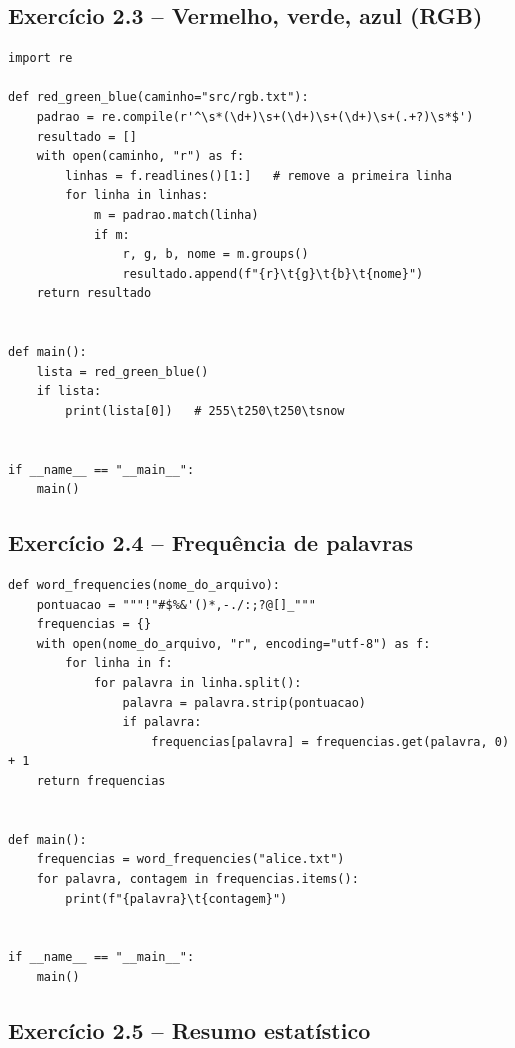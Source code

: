\documentclass[11pt,a4paper]{article}
\begin{document}
\subsection*{Exercício 2.3 -- Vermelho, verde, azul (RGB)}

\begin{solucao}
\begin{lstlisting}
import re

def red_green_blue(caminho="src/rgb.txt"):
    padrao = re.compile(r'^\s*(\d+)\s+(\d+)\s+(\d+)\s+(.+?)\s*$')
    resultado = []
    with open(caminho, "r") as f:
        linhas = f.readlines()[1:]   # remove a primeira linha
        for linha in linhas:
            m = padrao.match(linha)
            if m:
                r, g, b, nome = m.groups()
                resultado.append(f"{r}\t{g}\t{b}\t{nome}")
    return resultado


def main():
    lista = red_green_blue()
    if lista:
        print(lista[0])   # 255\t250\t250\tsnow


if __name__ == "__main__":
    main()
\end{lstlisting}
\end{solucao}

\subsection*{Exercício 2.4 -- Frequência de palavras}

\begin{solucao}
\begin{lstlisting}
def word_frequencies(nome_do_arquivo):
    pontuacao = """!"#$%&'()*,-./:;?@[]_"""
    frequencias = {}
    with open(nome_do_arquivo, "r", encoding="utf-8") as f:
        for linha in f:
            for palavra in linha.split():
                palavra = palavra.strip(pontuacao)
                if palavra:
                    frequencias[palavra] = frequencias.get(palavra, 0) + 1
    return frequencias


def main():
    frequencias = word_frequencies("alice.txt")
    for palavra, contagem in frequencias.items():
        print(f"{palavra}\t{contagem}")


if __name__ == "__main__":
    main()
\end{lstlisting}
\end{solucao}

\subsection*{Exercício 2.5 -- Resumo estatístico}
\end{document}
